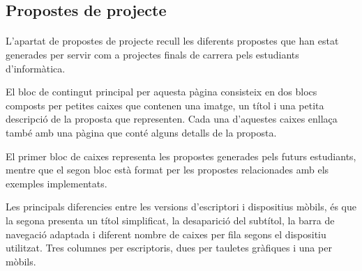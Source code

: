 \subsection{Propostes de projecte}

    \paragraph{}
    L'apartat de propostes de projecte recull les diferents propostes que han estat generades per servir com a projectes finals de carrera pels estudiants d'informàtica.

    El bloc de contingut principal per aquesta pàgina consisteix en dos blocs composts per petites caixes que contenen una imatge, un títol i una petita descripció de la proposta que representen. Cada una d'aquestes caixes enllaça també amb una pàgina que conté alguns detalls de la proposta.

    El primer bloc de caixes representa les propostes generades pels futurs estudiants, mentre que el segon bloc està format per les propostes relacionades amb els exemples implementats.

    Les principals diferencies entre les versions d'escriptori i dispositius mòbils, és que la segona presenta un títol simplificat, la desaparició del subtítol, la barra de navegació adaptada i diferent nombre de caixes per fila segons el dispositiu utilitzat. Tres columnes per escriptoris, dues per tauletes gràfiques i una per mòbils.

